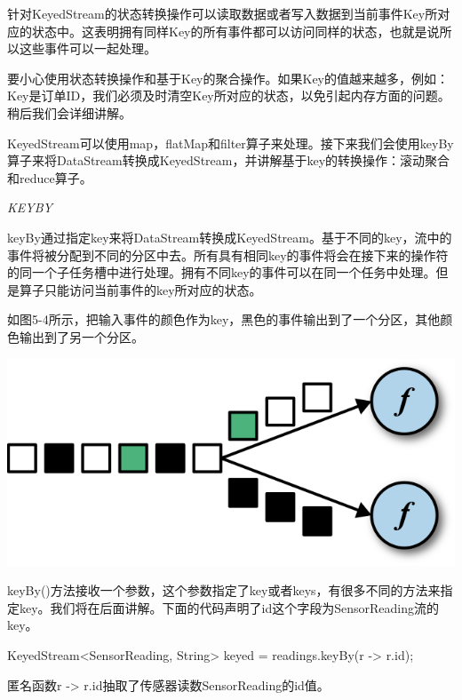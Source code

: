 \documentclass[cn,11pt,chinese]{elegantbook}
\newenvironment{Shaded}{}{}
\newcommand{\BuiltInTok}[1]{#1}
\newcommand{\FunctionTok}[1]{\textcolor[rgb]{0.02,0.16,0.49}{#1}}
\newcommand{\NormalTok}[1]{#1}
\renewenvironment{quote}{\begin{customblockquote}\list{}{\rightmargin=0em\leftmargin=0em}%
\item\relax\color{blockquote-text}\ignorespaces}{\unskip\unskip\endlist\end{customblockquote}}
\begin{document}
针对KeyedStream的状态转换操作可以读取数据或者写入数据到当前事件Key所对应的状态中。这表明拥有同样Key的所有事件都可以访问同样的状态，也就是说所以这些事件可以一起处理。

\begin{quote}
要小心使用状态转换操作和基于Key的聚合操作。如果Key的值越来越多，例如：Key是订单ID，我们必须及时清空Key所对应的状态，以免引起内存方面的问题。稍后我们会详细讲解。
\end{quote}

KeyedStream可以使用map，flatMap和filter算子来处理。接下来我们会使用keyBy算子来将DataStream转换成KeyedStream，并讲解基于key的转换操作：滚动聚合和reduce算子。

\emph{KEYBY}

keyBy通过指定key来将DataStream转换成KeyedStream。基于不同的key，流中的事件将被分配到不同的分区中去。所有具有相同key的事件将会在接下来的操作符的同一个子任务槽中进行处理。拥有不同key的事件可以在同一个任务中处理。但是算子只能访问当前事件的key所对应的状态。

如图5-4所示，把输入事件的颜色作为key，黑色的事件输出到了一个分区，其他颜色输出到了另一个分区。

\includegraphics{images/spaf_0504.png}

keyBy()方法接收一个参数，这个参数指定了key或者keys，有很多不同的方法来指定key。我们将在后面讲解。下面的代码声明了id这个字段为SensorReading流的key。

\begin{Shaded}
\begin{Highlighting}[]
\NormalTok{KeyedStream\textless{}SensorReading, }\BuiltInTok{String}\NormalTok{\textgreater{} keyed = readings.}\FunctionTok{keyBy}\NormalTok{(r {-}\textgreater{} r.}\FunctionTok{id}\NormalTok{);}
\end{Highlighting}
\end{Shaded}

匿名函数r -\textgreater{} r.id抽取了传感器读数SensorReading的id值。
\end{document}
